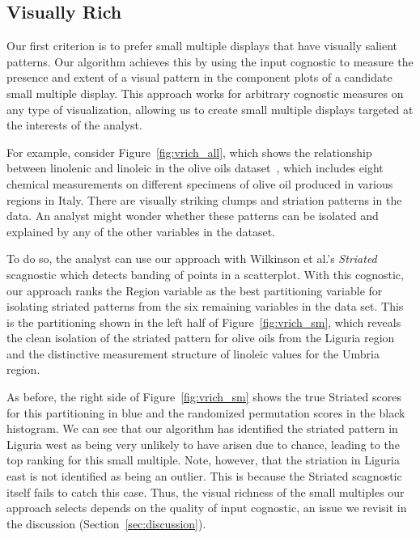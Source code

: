 \subsection{Visually Rich}
Our first criterion is to prefer small multiple displays that have visually salient patterns. Our algorithm achieves this by using the input cognostic to measure the presence and extent of a visual pattern in the component plots of a candidate small multiple display. This approach works for arbitrary cognostic measures on any type of visualization, allowing us to create small multiple displays targeted at the interests of the analyst. 

For example, consider Figure~\ref{fig:vrich_all}, which shows the relationship between linolenic and linoleic in the olive oils dataset~\cite{Forina1983}, which includes eight chemical measurements on different specimens of olive oil produced in various regions in Italy. There are visually striking clumps and striation patterns in the data. An analyst might wonder whether these patterns can be isolated and explained by any of the other variables in the dataset.

To do so, the analyst can use our approach with Wilkinson et al.'s \emph{Striated} scagnostic which detects banding of points in a scatterplot. With this cognostic, our approach ranks the Region variable as the best partitioning variable for isolating striated patterns from the six remaining variables in the data set. This is the partitioning shown in the left half of Figure~\ref{fig:vrich_sm}, which reveals the clean isolation of the striated pattern for olive oils from the Liguria region and the distinctive measurement structure of linoleic values for the Umbria region.

As before, the right side of Figure~\ref{fig:vrich_sm} shows the true Striated scores for this partitioning in blue and the randomized permutation scores in the black histogram. We can see that our algorithm has identified the striated pattern in Liguria west as being very unlikely to have arisen due to chance, leading to the top ranking for this small multiple. 
Note, however, that the striation in Liguria east is not identified as being an outlier. This is because the Striated scagnostic itself fails to catch this case. Thus, the visual richness of the small multiples our approach selects depends on the quality of input cognostic, an issue we revisit in the discussion (Section~\ref{sec:discussion}).

